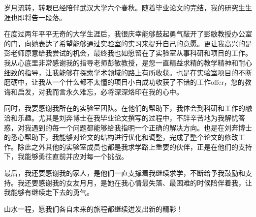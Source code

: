 
岁月流转，转眼已经陪伴武汉大学六个春秋。随着毕业论文的完结，我的研究生生涯也即将告一段落。

在度过两年平平无奇的大学生涯后，我很庆幸能够鼓起勇气敲开了彭敏教授办公室的门，向她表达了希望能够通过实验室的实习来提升自己的意愿。更让我高兴的是彭老师原意给我尝试的机会，最终我也如愿留在了实验室从事科研和项目的工作。我从心底里非常感谢我的指导老师彭敏教授，是您一直精益求精的教学精神和耐心细致的指导，让我能够在探索学术领域的路上有所收获。也是在实验室项目的不断磨砺中，让我从一个什么都不太懂的项目小白成功收获了不错的工作offer，您的教诲和启发，对我而言永久难忘，必将深深烙印在我的心中。

同时，我要感谢我所在的实验室团队。在他们的帮助下，我体会到科研和工作的融洽和乐趣。尤其是刘奔博士在我毕业论文撰写的过程中，不辞辛苦地为我解忧答惑，对我遇到的每一个问题都能够给我指明一个正确的解决方向。也是在刘奔博士的悉心帮助下，我能够对论文的结构进行优化和调整，完成了整个论文的修改工作。除此之外其他的实验室成员也都是我求学路上重要的伙伴，正是在他们的支持下，我能够勇往直前并应对每一个挑战。

最后，我还要感谢我的家人，是他们一直支撑着我继续求学，不断给予我鼓励和支持。我还要感谢我的女友月月，是她在我心情最失落、最困难的时候陪伴着我，让我能够有继续走下去的勇气。

山水一程，愿我们各自未来的旅程都继续迸发出新的精彩！

